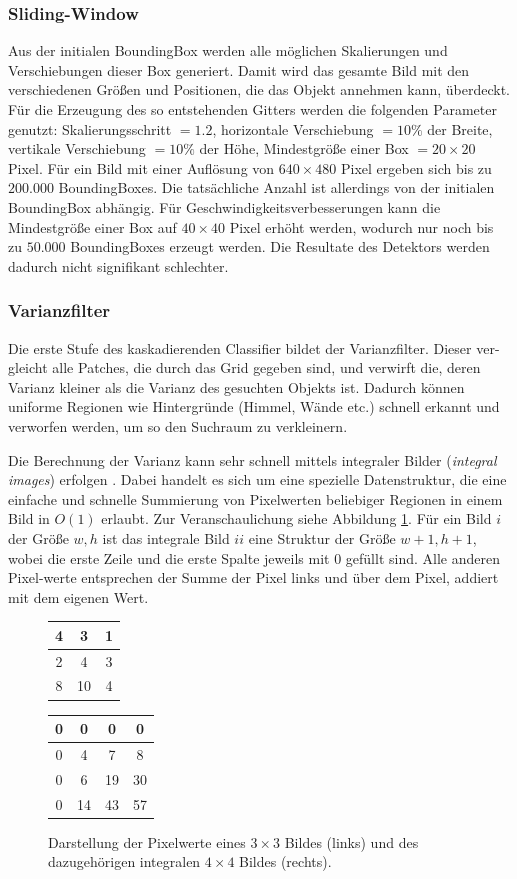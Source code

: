 	\subsubsection{Sliding-Window}
	Aus der initialen BoundingBox werden alle möglichen Skalierungen und Verschiebungen dieser Box generiert. Damit wird das gesamte Bild mit den verschiedenen Größen und Positionen, die das Objekt annehmen kann, überdeckt. Für die Erzeugung des so entstehenden Gitters werden die folgenden Parameter genutzt: Skalierungsschritt $=1.2$, horizontale Verschiebung $=10\%$ der Breite, vertikale Verschiebung $=10\%$ der Höhe, Mindestgröße einer Box $=20\times20$ Pixel. Für ein Bild mit einer Auflösung von $640\times480$ Pixel ergeben sich bis zu $200.000$ BoundingBoxes. Die tatsächliche Anzahl ist allerdings von der initialen BoundingBox abhängig. Für Geschwindigkeitsverbesserungen kann die Mindestgröße einer Box auf $40\times40$ Pixel erhöht werden, wodurch nur noch bis zu $50.000$ BoundingBoxes erzeugt werden. Die Resultate des Detektors werden dadurch nicht signifikant schlechter.

	\subsubsection{Varianzfilter}
	Die erste Stufe des kaskadierenden Classifier bildet der Varianzfilter. Dieser ver-gleicht alle Patches, die durch das Grid gegeben sind, und verwirft die, deren Varianz kleiner als die Varianz des gesuchten Objekts ist. Dadurch können uniforme Regionen wie Hintergründe (Himmel, Wände etc.) schnell erkannt und verworfen werden, um so den Suchraum zu verkleinern.

	Die Berechnung der Varianz kann sehr schnell mittels integraler Bilder (\textit{integral images}) erfolgen \cite{key-6}. Dabei handelt es sich um eine spezielle Datenstruktur, die eine einfache und schnelle Summierung von Pixelwerten beliebiger Regionen in einem Bild in $O(1)$ erlaubt. Zur Veranschaulichung siehe Abbildung \ref{integralImg}. Für ein Bild $i$ der Größe $w,h$ ist das integrale Bild $ii$ eine Struktur der Größe $w+1,h+1$, wobei die erste Zeile und die erste Spalte jeweils mit $0$ gefüllt sind. Alle anderen Pixel-werte entsprechen der Summe der Pixel links und über dem Pixel, addiert mit dem eigenen Wert.

	\begin{figure}[h]
	\centering{}%
	\begin{tabular}{|c|c|c|}
	\hline
	4 & 3 & 1
	\tabularnewline
	\hline
	\hline
	2 & 4 & 3
	\tabularnewline
	\hline
	8 & 10 & 4
	\tabularnewline
	\hline
	\end{tabular} %
	\begin{tabular}{|c|c|c|c|}
	\hline
	0 & 0 & 0 & 0
	\tabularnewline
	\hline
	\hline
	0 & 4 & 7 & 8\tabularnewline
	\hline
	0 & 6 & 19 & 30
	\tabularnewline
	\hline
	0 & 14 & 43 & 57
	\tabularnewline
	\hline
	\end{tabular}\caption{Darstellung der Pixelwerte eines $3\times3$ Bildes (links) und des
	dazugehörigen integralen $4\times4$ Bildes (rechts).}
	\label{integralImg}
	\end{figure}

